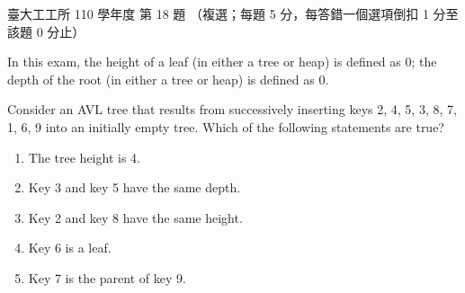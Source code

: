 \begin{pastexam}[label={px:ntu-110-ie-ds-18}]{臺大工工所 110 學年度 第 18 題}
（複選；每題 5 分，每答錯一個選項倒扣 1 分至該題 0 分止）

In this exam, the height of a leaf (in either a tree or heap) is defined as 0; the depth of the root (in
either a tree or heap) is defined as 0.

Consider an AVL tree that results from successively inserting keys 2, 4, 5, 3, 8, 7, 1, 6, 9 into an
initially empty tree. Which of the following statements are true?
\begin{enumerate}[label=(\Alph*)]
\item The tree height is 4.
\item Key 3 and key 5 have the same depth.
\item Key 2 and key 8 have the same height.
\item Key 6 is a leaf.
\item Key 7 is the parent of key 9.
\end{enumerate}
\end{pastexam}

